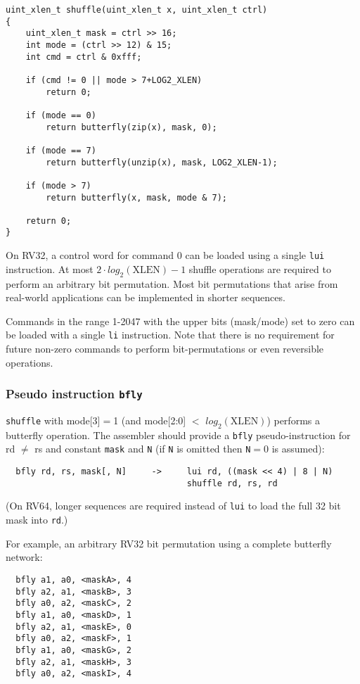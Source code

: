 \begin{verbatim}
uint_xlen_t shuffle(uint_xlen_t x, uint_xlen_t ctrl)
{
    uint_xlen_t mask = ctrl >> 16;
    int mode = (ctrl >> 12) & 15;
    int cmd = ctrl & 0xfff;

    if (cmd != 0 || mode > 7+LOG2_XLEN)
        return 0;

    if (mode == 0)
        return butterfly(zip(x), mask, 0);

    if (mode == 7)
        return butterfly(unzip(x), mask, LOG2_XLEN-1);

    if (mode > 7)
        return butterfly(x, mask, mode & 7);

    return 0;
}
\end{verbatim}

On RV32, a control word for command 0 can be loaded using a single \texttt{lui} instruction.
At most $2\cdot{}log_2(\textrm{XLEN})-1$ shuffle operations are required to
perform an arbitrary bit permutation. Most bit permutations that arise from
real-world applications can be implemented in shorter sequences.

Commands in the range 1-2047 with the upper bits (mask/mode) set to zero can be
loaded with a single \texttt{li} instruction. Note that there is no
requirement for future non-zero commands to perform bit-permutations or even
reversible operations.



\subsubsection{Pseudo instruction {\tt bfly}}

{\tt shuffle} with mode[3]$=$1 (and mode[2:0] $<$ $log_2(\textrm{XLEN})$) performs
a butterfly operation. The assembler should provide a {\tt bfly} pseudo-instruction
for rd $\neq$ rs and constant {\tt mask} and {\tt N} (if {\tt N} is omitted then
{\tt N}$=$0 is assumed):

\begin{verbatim}
  bfly rd, rs, mask[, N]     ->     lui rd, ((mask << 4) | 8 | N)
                                    shuffle rd, rs, rd
\end{verbatim}

(On RV64, longer sequences are required instead of {\tt lui} to load the full
32 bit mask into {\tt rd}.)

For example, an arbitrary RV32 bit permutation using a complete butterfly network:

\begin{verbatim}
  bfly a1, a0, <maskA>, 4
  bfly a2, a1, <maskB>, 3
  bfly a0, a2, <maskC>, 2
  bfly a1, a0, <maskD>, 1
  bfly a2, a1, <maskE>, 0
  bfly a0, a2, <maskF>, 1
  bfly a1, a0, <maskG>, 2
  bfly a2, a1, <maskH>, 3
  bfly a0, a2, <maskI>, 4
\end{verbatim}

